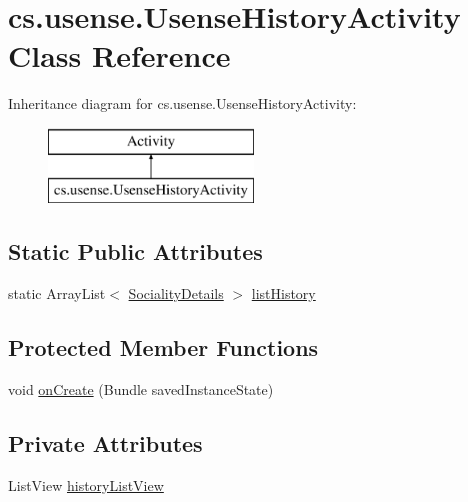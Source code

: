 \hypertarget{classcs_1_1usense_1_1_usense_history_activity}{}\section{cs.\+usense.\+Usense\+History\+Activity Class Reference}
\label{classcs_1_1usense_1_1_usense_history_activity}
Inheritance diagram for cs.\+usense.\+Usense\+History\+Activity\+:\begin{figure}[H]
\begin{center}
\leavevmode
\includegraphics[height=2.000000cm]{classcs_1_1usense_1_1_usense_history_activity}
\end{center}
\end{figure}
\subsection*{Static Public Attributes}
\begin{DoxyCompactItemize}
\item 
static Array\+List$<$ \hyperlink{classcs_1_1usense_1_1inference_module_1_1_sociality_details}{Sociality\+Details} $>$ \hyperlink{classcs_1_1usense_1_1_usense_history_activity_a2fc0107cef126d33f21bf69fd05b618f}{list\+History}
\end{DoxyCompactItemize}
\subsection*{Protected Member Functions}
\begin{DoxyCompactItemize}
\item 
void \hyperlink{classcs_1_1usense_1_1_usense_history_activity_a9ac59016fd9c86be6b33fb2ebf3cb7a0}{on\+Create} (Bundle saved\+Instance\+State)
\end{DoxyCompactItemize}
\subsection*{Private Attributes}
\begin{DoxyCompactItemize}
\item 
List\+View \hyperlink{classcs_1_1usense_1_1_usense_history_activity_acd16e092197c435f5f934ef0b35a90ff}{history\+List\+View}
\end{DoxyCompactItemize}
